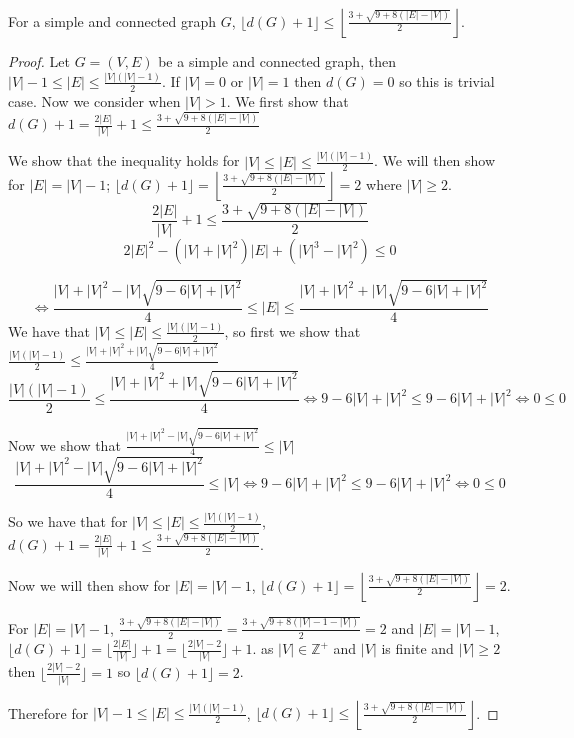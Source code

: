 \documentclass[10pt,a4paper]{amsart}
\begin{document}
\begin{lemma}\label{lemImpov}
    For a simple and connected graph $G$, $\lfloor d(G)+1 \rfloor \leq \left\lfloor \frac{3+\sqrt{9+8(|E|-|V|)}}{2} \right\rfloor$.
\end{lemma}

\begin{proof}
    Let $G = (V,E)$ be a simple and connected graph, then $|V|-1 \leq |E| \leq \frac{|V|(|V|-1)}{2}$. If $|V| = 0$ or $|V|=1$ then $d(G) = 0$ so this is trivial case. Now we consider when $|V| > 1$.
    We first show that $d(G)+1 = \frac{2|E|}{|V|} + 1 \leq  \frac{3+\sqrt{9+8(|E|-|V|)}}{2}$ 

    We show that the inequality holds for $|V| \leq |E| \leq \frac{|V|(|V|-1)}{2}$. We will then show for $|E| = |V|-1$; $\lfloor d(G)+1 \rfloor = \left\lfloor \frac{3+\sqrt{9+8(|E|-|V|)}}{2} \right\rfloor =2$ where $|V| \geq 2$.
    $$\frac{2|E|}{|V|} + 1  \leq  \frac{3+\sqrt{9+8(|E|-|V|)}}{2}$$
    $$2|E|^2 - (|V|+|V|^2)|E| + (|V|^3-|V|^2) \leq 0$$
   
    $$\iff \frac{|V|+|V|^2-|V|\sqrt{9-6|V|+|V|^2}}{4} \leq |E| \leq \frac{|V|+|V|^2+|V|\sqrt{9-6|V|+|V|^2}}{4}$$
    We have that $|V| \leq |E| \leq \frac{|V|(|V|-1)}{2}$, so first we show that 
    $\frac{|V|(|V|-1)}{2} \leq \frac{|V|+|V|^2+|V|\sqrt{9-6|V|+|V|^2}}{4}$
    $$\frac{|V|(|V|-1)}{2} \leq \frac{|V|+|V|^2+|V|\sqrt{9-6|V|+|V|^2}}{4} \iff 9-6|V|+|V|^2 \leq 9-6|V|+|V|^2 \iff 0 \leq 0$$
   
    Now we show that $\frac{|V|+|V|^2-|V|\sqrt{9-6|V|+|V|^2}}{4} \leq |V|$
    $$\frac{|V|+|V|^2-|V|\sqrt{9-6|V|+|V|^2}}{4} \leq |V| \iff 9-6|V|+|V|^2 \leq 9-6|V|+|V|^2 \iff 0 \leq 0$$
   
    So we have that for $|V| \leq |E| \leq \frac{|V|(|V|-1)}{2}$, \;$d(G)+1 = \frac{2|E|}{|V|} + 1 \leq  \frac{3+\sqrt{9+8(|E|-|V|)}}{2}$.
    
    Now we will then show for $|E| = |V|-1$, $\lfloor d(G)+1 \rfloor = \left\lfloor \frac{3+\sqrt{9+8(|E|-|V|)}}{2} \right\rfloor = 2$.
    
    For \;$|E| = |V|-1$, $\frac{3+\sqrt{9+8(|E|-|V|)}}{2} = \frac{3+\sqrt{9+8(|V|-1-|V|)}}{2} = 2$ \;and 
    \;$|E| = |V|-1$, $\lfloor d(G)+1 \rfloor = \lfloor \frac{2|E|}{|V|} \rfloor + 1  = \lfloor \frac{2|V| - 2}{|V|} \rfloor + 1$.
    as $|V| \in \mathbb{Z}^+$ and $|V|$ is finite and $|V| \geq 2$ then $\lfloor \frac{2|V| - 2}{|V|} \rfloor = 1$
    so $\lfloor d(G)+1 \rfloor = 2$.
  
    Therefore for $|V|-1 \leq |E| \leq \frac{|V|(|V|-1)}{2}$,  $\lfloor d(G)+1 \rfloor \leq \left\lfloor \frac{3+\sqrt{9+8(|E|-|V|)}}{2} \right\rfloor$.
    
\end{proof}
\end{document}
